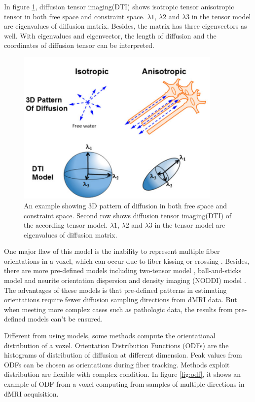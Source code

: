In figure \ref*{fig:DTI}, diffusion tensor imaging(DTI) shows isotropic tensor anisotropic tensor in 
both free space and constraint space. 
$\lambda 1$, $\lambda 2$ and $\lambda 3$ in the tensor model are eigenvalues of diffusion matrix.
Besides, the matrix has three eigenvectors as well. With eigenvalues and eigenvector, the length of diffusion 
and the coordinates of diffusion tensor can be interpreted.

\begin{figure}[ht]
    \centering
    \includegraphics[width= 10cm]{figures/DTI.png}
        \caption{An example showing 3D pattern of diffusion in both free space and constraint space. 
        Second row shows diffusion tensor imaging(DTI) of the according tensor model. 
        $\lambda 1$, $\lambda 2$ and $\lambda 3$ in the tensor model are eigenvalues of diffusion matrix.}
    \label{fig:DTI}
\end{figure}

One major flaw of this model is the inability to represent multiple fiber orientations in a voxel, which can occur due to fiber kissing or crossing \cite*{tournierDirectEstimationFiber2004}.
Besides, there are more pre-defined models including two-tensor model \cite*[]{qaziResolvingCrossingsCorticospinal2009}, ball-and-sticks model \cite*[]{behrensCharacterizationPropagationUncertainty2003}
and neurite orientation dispersion and density imaging (NODDI) model \cite*[]{zhangNODDIPracticalVivo2012}. 
The advantages of these models is that pre-defined patterns in estimating orientations require fewer diffusion sampling directions from dMRI data. 
But when meeting more complex cases such as pathologic data, the results from pre-defined models can't be ensured.

Different from using models, some methods compute the orientational distribution of a voxel. 
Orientation Distribution Functions (ODFs) are the histograms of distribution of diffusion at different dimension. 
Peak values from ODFs can be chosen as orientations during fiber tracking. Methods exploit distribution are flexible with complex condition.
In figure \ref*{fig:odf}, it shows an example of ODF from a voxel computing from samples of multiple directions in dMRI acquisition.

